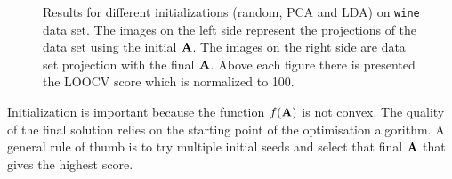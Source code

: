 \begin{figure}
	  
	  
	  \caption{\small Results for different initializations (random, PCA and LDA) on \texttt{wine} data set. The images on the left side represent the projections of the data set using the initial $\mathbf{A}$. The images on the right side are data set projection with the final $\mathbf{A}$. Above each figure there is presented the LOOCV score which is normalized to 100.}
	  \label{fig:init}
    \end{figure}

    Initialization is important because the function $f(\mathbf{A})$ is not convex. The quality of the final solution relies on the starting point of the optimisation algorithm. A general rule of thumb is to try multiple initial seeds and select that final $\mathbf{A}$ that gives the highest score.

